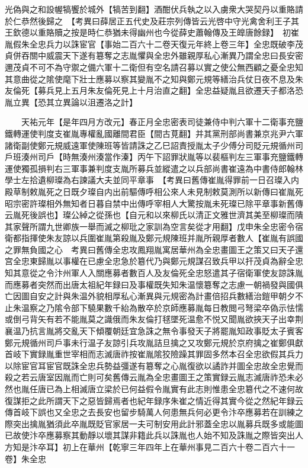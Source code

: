 光偽與之和設幄犒饗於城外【犒苦到翻】酒酣伏兵執之以入虜衆大哭契丹以重賂請於仁恭然後歸之　【考異曰薛居正五代史及莊宗列傳皆云光啓中守光禽舍利王子其王欽德以重賂贖之按是時仁恭猶未得幽州也今從薛史蕭翰傳及王皥唐餘録】　初崔胤假朱全忠兵力以誅宦官【事始二百六十二卷天復元年終上卷三年】全忠既破李茂貞併吞關中威震天下遂有簒奪之志胤懼與全忠外雖親厚私心漸異乃謂全忠曰長安密邇茂貞不可不為守禦之備六軍十二衛但有空名請召募以實之使公無西顧之憂全忠知其意曲從之隂使麾下壯士應募以察其變胤不之知與鄭元規等繕治兵仗日夜不息及朱友倫死【募兵見上五月朱友倫死見上十月治直之翻】全忠益疑胤且欲遷天子都洛恐胤立異【恐其立異論以沮遷洛之計】

　　天祐元年【是年四月方改元】春正月全忠密表司徒兼侍中判六軍十二衛事充鹽鐵轉運使判度支崔胤專權亂國離間君臣【間古莧翻】并其黨刑部尚書兼京兆尹六軍諸衛副使鄭元規威遠軍使陳班等皆請誅之乙巳詔責授胤太子少傅分司貶元規循州司戶班湊州司戶【時無湊州湊當作溱】丙午下詔罪狀胤等以裴樞判左三軍事充鹽鐵轉運使獨孤損判右三軍事兼判度支胤所募兵並縱遣之以兵部尚書崔遠為中書侍郎翰林學士左拾遺柳璨為右諫議大夫並同平章事　【考異曰舊傳崔胤得罪前一日召璨入内殿草制敕胤死之日既夕璨自内出前驅傳呼相公來人未見制敕莫測所以新傳曰崔胤死昭宗密許璨相外無知者日暮自禁中出傳呼宰相人大驚按胤未死璨已除平章事新舊傳云胤死後誤也】璨公綽之從孫也【自元和以來柳氏以清正文雅世濟其美至柳璨而隤其家聲所謂九世卿族一舉而滅之柳玭之家訓為空言矣從才用翻】戊申朱全忠密令宿衛都指揮使朱友諒以兵圍崔胤第殺胤及鄭元規陳班并胤所親厚者數人【崔胤有誤國之罪無負國之心　考異曰舊傳全忠攻鳳翔胤寓居華州為全忠畫圖王之策又曰天子還宫全忠東歸胤以事權在已慮全忠急於簒代乃與鄭元規謀召致兵甲以扞茂貞為辭全忠知其意從之令汴州軍人入關應募者數百人及友倫死全忠怒遣其子宿衛軍使友諒誅胤而應募者突然而出唐太祖紀年録曰及事權既失知朱温懷簒奪之志慮一朝禍發與國俱亡因圖自安之計與朱温外貌相厚私心漸異與元規密為計畫倍招兵數繕治鎧甲朝夕不止朱温察之乃隂令部下驍果數千紿為散卒於京師應募胤每日教閲弓弩梁卒偽示怯懦或倒弓背矢有若不能胤莫之識俄而朱友倫打毬墜死温愈不悦又聞胤欲挾天子出幸荆襄温乃抗言胤將交亂天下傾覆朝廷宜急誅之無令事發天子將罷胤知政事貶太子賓客鄭元規循州司戶事未行温子友諒引兵攻胤詰旦擒之又攻鄭元規於京府擒之崔鄭俱獻首岐下實録胤重世宰相而志滅唐祚按崔胤隂狡險躁其罪固多然本召全忠欲假其兵力以除宦官耳宦官既誅全忠兵勢益彊遂有簒奪之心胤復欲以譎詐并圖全忠故全忠覺而殺之若云唐室因胤而亡則可矣舊傳云胤為全忠畫圖王之策實録云胤志滅唐祚恐未必然也胤任唐已為上相滅唐立梁於已何益假令胤實有此志則惟患全忠簒代之不速何故復謀拒之此所謂天下之惡皆歸焉者也紀年録序朱崔之情近得其實今從之然紀年録云傳首岐下誤也又全忠之去長安也留步騎萬人何患無兵何必更令汴卒應募若在訓練之際突出擒胤猶須此卒胤既貶官家居一夫可制安用此計邪蓋全忠以胤募兵既多或能圖已故使汴卒應募察其動靜以壞其謀非籍此兵以誅胤也人始不知及誅胤之際皆突出人方知是汴卒耳】初上在華州【乾寧三年四年上在華州事見二百六十卷二百六十一卷】朱全忠

